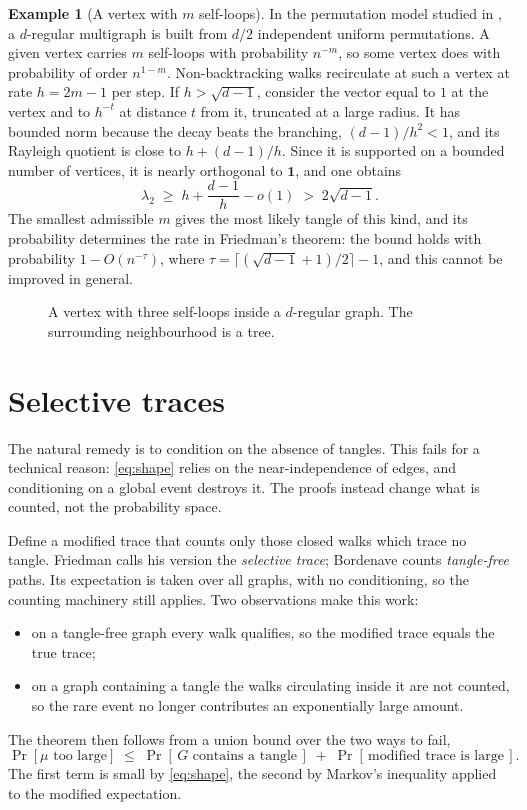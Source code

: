 \documentclass[11pt,letterpaper]{article}
\theoremstyle{definition}
\newtheorem{example}[theorem]{Example}
\theoremstyle{remark}
\newcommand{\edge}{2\sqrt{d-1}}
\newcommand{\one}{\mathbf{1}}
\begin{document}
\begin{example}[A vertex with $m$ self-loops]\label{ex:loops}
In the permutation model studied in \cite{F}, a $d$-regular multigraph is built from $d/2$
independent uniform permutations. A given vertex carries $m$ self-loops with probability
$n^{-m}$, so some vertex does with probability of order $n^{1-m}$. Non-backtracking walks
recirculate at such a vertex at rate $h=2m-1$ per step. If $h>\sqrt{d-1}$, consider the vector
equal to $1$ at the vertex and to $h^{-t}$ at distance $t$ from it, truncated at a large radius.
It has bounded norm because the decay beats the branching, $(d-1)/h^2<1$, and its Rayleigh
quotient is close to $h+(d-1)/h$. Since it is supported on a bounded number of vertices, it is
nearly orthogonal to $\one$, and one obtains \cite[Theorem~2.11]{F}
\[
  \lambda_2\;\ge\;h+\frac{d-1}{h}-o(1)\;>\;\edge .
\]
The smallest admissible $m$ gives the most likely tangle of this kind, and its probability
determines the rate in Friedman's theorem: the bound holds with probability
$1-O(n^{-\tau})$, where $\tau=\lceil(\sqrt{d-1}+1)/2\rceil-1$, and this cannot be improved in
general.
\end{example}

\begin{figure}[ht]
  \centering
  
  \caption{A vertex with three self-loops inside a $d$-regular graph. The surrounding
  neighbourhood is a tree.}
  \label{fig:tangle}
\end{figure}

\section{Selective traces}

The natural remedy is to condition on the absence of tangles. This fails for a technical reason:
\eqref{eq:shape} relies on the near-independence of edges, and conditioning on a global event
destroys it. The proofs instead change what is counted, not the probability space.

Define a modified trace that counts only those closed walks which trace no tangle. Friedman
calls his version the \emph{selective trace}; Bordenave \cite{B} counts \emph{tangle-free} paths.
Its expectation is taken over all graphs, with no conditioning, so the counting machinery still
applies. Two observations make this work:
\begin{itemize}
  \item on a tangle-free graph every walk qualifies, so the modified trace equals the true trace;
  \item on a graph containing a tangle the walks circulating inside it are not counted, so the
        rare event no longer contributes an exponentially large amount.
\end{itemize}
The theorem then follows from a union bound over the two ways to fail,
\[
  \Pr[\mu\text{ too large}]\;\le\;\Pr[\,G\text{ contains a tangle}\,]\;+\;\Pr[\,\text{modified trace is large}\,].
\]
The first term is small by \eqref{eq:shape}, the second by Markov's inequality applied to the
modified expectation.
\end{document}
